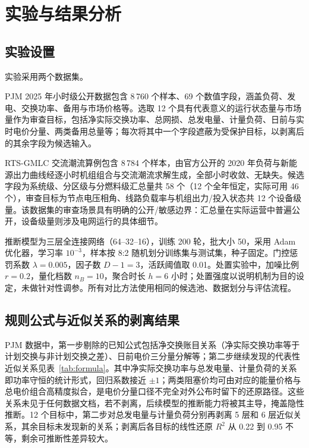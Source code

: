 \documentclass[UTF8,zihao=5,twoside,fontset=none]{ctexart}
\begin{document}
\section{实验与结果分析}

\subsection{实验设置}

实验采用两个数据集。

PJM 2025 年小时级公开数据\cite{ref-pjm-dataminer}包含 8\,760 个样本、69 个数值字段，涵盖负荷、发电、交换功率、备用与市场价格等。选取 12 个具有代表意义的运行状态量与市场量作为审查目标，包括净实际交换功率、总网损、总发电量、计量负荷、日前与实时电价分量、两类备用总量等；每次将其中一个字段遮蔽为受保护目标，以剥离后的其余字段为候选输入。

RTS-GMLC 交流潮流算例\cite{ref-rtsgmlc}包含 8\,784 个样本，由官方公开的 2020 年负荷与新能源出力曲线经逐小时机组组合与交流潮流求解生成，全部小时收敛、无缺失。候选字段为系统级、分区级与分燃料级汇总量共 58 个（12 个全年恒定，实际可用 46 个），审查目标为节点电压相角、线路负载率与机组出力/投入状态共 12 个设备级量。该数据集的审查场景具有明确的公开/敏感边界：汇总量在实际运营中普遍公开，设备级量则涉及电网运行的具体细节。

推断模型为三层全连接网络（64--32--16），训练 200 轮，批大小 50，采用 Adam 优化器\cite{ref-kingma-adam}，学习率 $10^{-3}$，样本按 8:2 随机划分训练集与测试集，种子固定。门控惩罚系数 $\lambda=0.005$，因子数 $D-1=3$，活跃阈值取 0.01。处置实验中，加噪比例 $r=0.2$，量化档数 $n_B=10$，聚合时长 $h=6$ 小时；处置强度以说明机制为目的设定，未做针对性调参。所有对比方法使用相同的候选池、数据划分与评估流程。

\subsection{规则公式与近似关系的剥离结果}

PJM 数据中，第一步剔除的已知公式包括净交换账目关系（净实际交换功率等于计划交换与非计划交换之差）、日前电价三分量分解等；第二步继续发现的代表性近似关系见表~\ref{tab:formula}。其中净实际交换功率与总发电量、计量负荷的关系即功率守恒的统计形式，回归系数接近 $\pm 1$；两类阻塞价均可由对应的能量价格与总电价组合高精度拟合，是电价分量口径不完全对外公布时留下的还原路径。这些关系未见于任何数据文档，若不剥离，后续模型的推断能力将被其主导，掩盖隐性推断。12 个目标中，第二步对总发电量与计量负荷分别再剥离 5 层和 6 层近似关系，其余目标未发现新的关系；剥离后各目标的线性还原 $R^2$ 从 0.22 到 0.95 不等，剩余可推断性差异较大。
\end{document}

